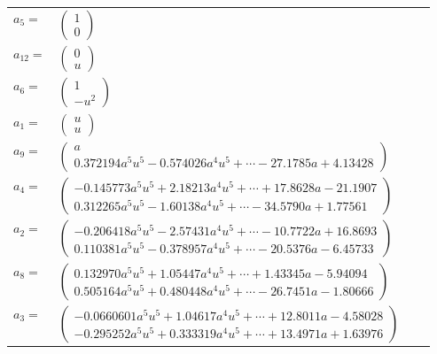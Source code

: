 \documentclass[1p]{elsarticle_modified}
\theoremstyle{definition}
\begin{document}
\begin{tabular}{m{7pt} m{180pt} m{7pt} m{180pt} }
\flushright $a_{5}=$&$\begin{pmatrix}1\\0\end{pmatrix}$ \\
\flushright $a_{12}=$&$\begin{pmatrix}0\\u\end{pmatrix}$ \\
\flushright $a_{6}=$&$\begin{pmatrix}1\\- u^2\end{pmatrix}$ \\
\flushright $a_{1}=$&$\begin{pmatrix}u\\u\end{pmatrix}$ \\
\flushright $a_{9}=$&$\begin{pmatrix}a\\0.372194 a^{5} u^{5}-0.574026 a^{4} u^{5}+\cdots-27.1785 a+4.13428\end{pmatrix}$ \\
\flushright $a_{4}=$&$\begin{pmatrix}-0.145773 a^{5} u^{5}+2.18213 a^{4} u^{5}+\cdots+17.8628 a-21.1907\\0.312265 a^{5} u^{5}-1.60138 a^{4} u^{5}+\cdots-34.5790 a+1.77561\end{pmatrix}$ \\
\flushright $a_{2}=$&$\begin{pmatrix}-0.206418 a^{5} u^{5}-2.57431 a^{4} u^{5}+\cdots-10.7722 a+16.8693\\0.110381 a^{5} u^{5}-0.378957 a^{4} u^{5}+\cdots-20.5376 a-6.45733\end{pmatrix}$ \\
\flushright $a_{8}=$&$\begin{pmatrix}0.132970 a^{5} u^{5}+1.05447 a^{4} u^{5}+\cdots+1.43345 a-5.94094\\0.505164 a^{5} u^{5}+0.480448 a^{4} u^{5}+\cdots-26.7451 a-1.80666\end{pmatrix}$ \\
\flushright $a_{3}=$&$\begin{pmatrix}-0.0660601 a^{5} u^{5}+1.04617 a^{4} u^{5}+\cdots+12.8011 a-4.58028\\-0.295252 a^{5} u^{5}+0.333319 a^{4} u^{5}+\cdots+13.4971 a+1.63976\end{pmatrix}$ \\

\end{tabular}
\end{document}
